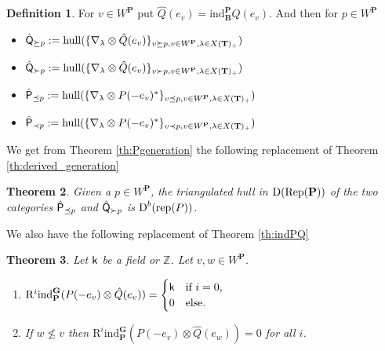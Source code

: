 \documentclass[sn-mathphys-num]{sn-jnl}%
\newcommand{\RR}{\mathrm R}
\newcommand{\rep}{{\mathrm{rep}}}
\newcommand{\ind}{{\mathrm{ind}}}
\newcommand{\hull}{{\mathrm{hull}}}
\newcommand{\Rep}{{\mathrm{Rep}}}
\newcommand*{\Dd}{\mathop{\mathrm D\kern0pt}\nolimits}
\newcommand{\sk}{{\sf k}}
\newcommand{\Z}{{\mathbb Z}}
\newcommand{\bg}{\mathbf G}
\newcommand{\fb}{\mathbf B}
\newcommand{\bt}{\mathbf T}
\newcommand{\bp}{\mathbf P}
\def\text#1{\mbox{#1}}
\newtheorem{theorem}{Theorem}[section]
\theoremstyle{definition}
\newtheorem{definition}[theorem]{Definition}%
\begin{document}
\begin{definition}
For $v\in W^\bp$ put $\hat Q(e_v)=\ind_\fb^\bp Q(e_v)$. And then for $p\in W^\bp$
\

\begin{itemize}

\item $\hat{\sf Q}_{\succeq p}:=\hull(\{\nabla_\lambda\otimes \hat Q(e_v)\}_{v\succeq p,  v\in W^\bp,\lambda\in X( \bt)_+})$




\item $\hat{\sf Q}_{\succ p}:=\hull(\{\nabla_\lambda\otimes \hat Q(e_v)\}_{v\succ p,  v\in W^\bp,\lambda\in X( \bt)_+})$





\item $\hat{\sf P}_{\preceq p}:=\hull(\{\nabla_\lambda\otimes P(-e_v)^*\}_{v\preceq p,  v\in W^\bp,\lambda\in X( \bt)_+})$



\item $\hat{\sf P}_{\prec p}:=\hull(\{\nabla_\lambda\otimes P(-e_v)^*\}_{v\prec p,  v\in W^\bp,\lambda\in X( \bt)_+})$

\end{itemize}
 \end{definition}

We get from Theorem \ref{th:Pgeneration} the following replacement of Theorem \ref{th:derived_generation} 

\begin{theorem}\label{th:Pderived_generation}
Given a $p\in W^\bp$, the triangulated hull in $\Dd(\Rep(\bp))$ of the two categories $\hat{\sf P}_{\preceq p}$ and 
$\hat{\sf Q}_{\succ p}$ 
is $\Dd^b (\rep ( P ))$. 
\end{theorem} 

 
 We also have the following replacement of Theorem \ref{th:indPQ}
 
 \begin{theorem}\label{th:PindPQ}Let $\sk$ be a field or $\Z$.
Let $v,w\in W^\bp$.
\begin{enumerate}
\item $\RR^i\ind_\bp^\bg (P(-e_v)\otimes \hat Q(e_v))=\begin{cases}\sk &\text{if $i=0$,}\\
0&\text{else.}\end{cases}$
\item If $w\not\leq v$ then $\RR^i\ind_\bp^\bg (P(-e_v)\otimes \hat Q(e_w))=0$ for all $i$.
\end{enumerate}
\end{theorem}
\end{document}
